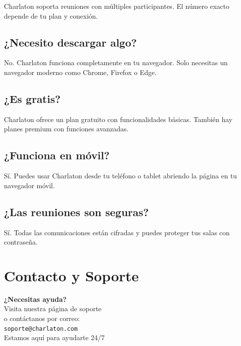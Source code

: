 \documentclass[11pt,a4paper]{article}
\begin{document}
Charlaton soporta reuniones con múltiples participantes. El número exacto depende de tu plan y conexión.

\subsection{¿Necesito descargar algo?}

No. Charlaton funciona completamente en tu navegador. Solo necesitas un navegador moderno como Chrome, Firefox o Edge.

\subsection{¿Es gratis?}

Charlaton ofrece un plan gratuito con funcionalidades básicas. También hay planes premium con funciones avanzadas.

\subsection{¿Funciona en móvil?}

Sí. Puedes usar Charlaton desde tu teléfono o tablet abriendo la página en tu navegador móvil.

\subsection{¿Las reuniones son seguras?}

Sí. Todas las comunicaciones están cifradas y puedes proteger tus salas con contraseña.

\section{Contacto y Soporte \faEnvelope}

\begin{center}
\begin{tcolorbox}[colback=charlatonBg,colframe=charlatonBlue,width=12cm,arc=10pt,boxrule=2pt]
    \centering
    \Large\color{charlatonBlue}\textbf{¿Necesitas ayuda?}\\[0.5cm]
    \normalsize\color{charlatonGray}
    Visita nuestra página de soporte\\[0.2cm]
    o contáctanos por correo:\\[0.3cm]
    \textcolor{charlatonCyan}{\texttt{soporte@charlaton.com}}\\[0.5cm]
    \small Estamos aquí para ayudarte 24/7
\end{tcolorbox}
\end{center}
\end{document}
